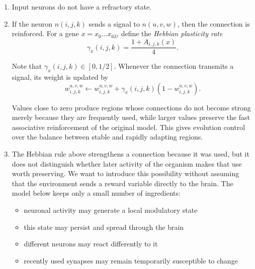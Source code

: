\documentclass[12pt,a4paper]{article}
\begin{document}
\begin{enumerate}
\begin{figure}[H]

		\caption{\footnotesize{Order of the refractory-state update within one simulation iteration. The current fatigue determines the effective threshold. If the neuron fires, it sends a signal and its fatigue is reset to the genetically determined maximum value $\rho_{\max}(x)=F_{0.4}(x)$. Otherwise, the fatigue is reduced by half.}}
		\label{fig:refractory_process}
	\end{figure}

	\item Input neurons do not have a refractory state.
	
	\item If the neuron $n(i,j,k)$ sends a signal to $n(u,v,w)$, then the connection is reinforced. For a gene $x=x_0\ldots x_{63}$, define the \emph{Hebbian plasticity rate}
	$$\gamma_x(i,j,k)=\frac{1 + A_{i,j,k}(x)}{4}.$$
	
	Note that $\gamma_x(i,j,k)\in[0,1/2]$. Whenever the connection transmits a signal, its weight is updated by
	$$w_{i,j,k}^{u,v,w}\leftarrow w_{i,j,k}^{u,v,w}+\gamma_x(i,j,k)\left(1-w_{i,j,k}^{u,v,w}\right).$$
	
	Values close to zero produce regions whose connections do not become strong merely because they are frequently used, while larger values preserve the fast associative reinforcement of the original model. This gives evolution control over the balance between stable and rapidly adapting regions.
	
	\item The Hebbian rule above strengthens a connection because it was used, but it does not distinguish whether later activity of the organism makes that use worth preserving. We want to introduce this possibility without assuming that the environment sends a reward variable directly to the brain. The model below keeps only a small number of ingredients: 
	
	\begin{itemize}
		\item neuronal activity may generate a local modulatory state
		\item this state may persist and spread through the brain
		\item different neurons may react differently to it
		\item recently used synapses may remain temporarily susceptible to change
	\end{itemize}
	

\end{enumerate}
\end{document}
